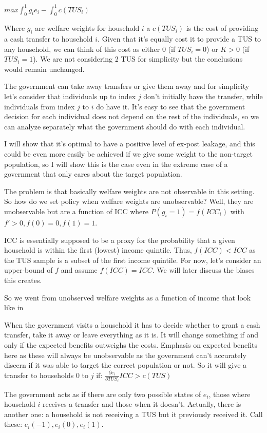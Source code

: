 \documentclass[12pt]{article}
\begin{document}
$max \int_{0}^{1}g_i e_i - \int_{0}^{1}c(TUS_i)$

Where $g_i$ are welfare weights for household $i$ a $c(TUS_i)$ is the cost of providing a cash transfer to household $i$. Given that it's equally cost it to provide a TUS to any household, we can think of this cost as either $0$ (if $TUS_i =0$) or $K>0$ (if $TUS_i =1$). We are not considering 2 TUS for simplicity but the conclusions would remain unchanged.

The government can take away transfers or give them away and for simplicity let's consider that individuals up to index $j$ don't initially have the transfer, while individuals from index $j$ to $i$ do have it. It's easy to see that the government decision for each individual does not depend on the rest of the individuals, so we can analyze separately what the government should do with each individual.

I will show that it's optimal to have a positive level of ex-post leakage, and this could be even more easily be achieved if we give some weight to the non-target population, so I will show this is the case even in the extreme case of a government that only cares about the target population.

The problem is that basically welfare weights are not observable in this setting. So how do we set policy when welfare weights are unobservable? Well, they are unobservable but are a function of ICC where $P(g_i=1)=f(ICC_i)$ with $f'>0,f(0)=0,f(1)=1$.

ICC is essentially supposed to be a proxy for the probability that a given household is within the first (lowest) income quintile. Thus, $f(ICC)<ICC$ as the TUS sample is a subset of the first income quintile. For now, let's consider an upper-bound of $f$ and assume $f(ICC)=ICC$. We will later discuss the biases this creates.

So we went from unobserved welfare weights as a function of income that look like in 

When the government visits a household it has to decide whether to grant a cash transfer, take it away or leave everything as it is. It will change something if and only if the expected benefits outweighs the costs. Emphasis on expected benefits here as these will always be unobservable as the government can't accurately discern if it was able to target the correct population or not. So it will give a transfer to households $0$ to $j$ if: $\frac{\partial e_i}{\partial TUS_i}ICC>c(TUS)$

The government acts as if there are only two possible states of $e_i$, those where household $i$ receives a transfer and those when it doesn't. Actually, there is another one: a household is not receiving a TUS but it previously received it. Call these: $e_i(-1), e_i(0), e_i(1)$.
\end{document}
